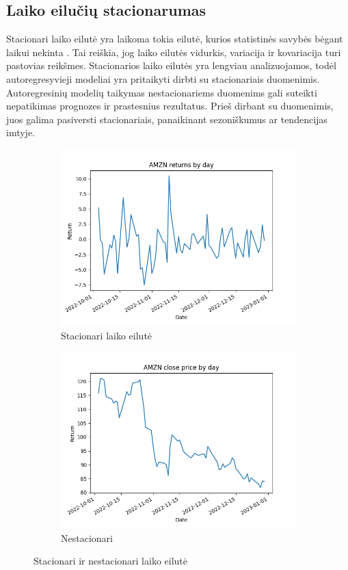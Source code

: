 \documentclass{VUMIFInfKursinis}
\begin{document}
\subsection {Laiko eilučių stacionarumas}
Stacionari laiko eilutė yra laikoma tokia eilutė, kurios statistinės savybės bėgant laikui nekinta \cite{nason2006stationary}. Tai reiškia, jog laiko eilutės vidurkis,
variacija ir kovariacija turi pastovias reikšmes. Stacionarios laiko eilutės yra lengviau analizuojamos, todėl autoregresyvieji modeliai yra pritaikyti dirbti su 
stacionariais duomenimis. Autoregresinių modelių taikymas nestacionariems duomenims gali suteikti nepatikimas prognozes ir prastesnius rezultatus. 
Prieš dirbant su duomenimis, juos galima pasiversti stacionariais, panaikinant sezoniškumus ar tendencijas imtyje.

\begin{figure}[H]
  \centering
  \begin{subfigure}{.5\textwidth}
    \centering
    \includegraphics[width=.6\linewidth]{img/AMZN_daily_return.png}
    \caption{Stacionari laiko eilutė}
    \label{fig:sub1}
  \end{subfigure}%
  \begin{subfigure}{.5\textwidth}
    \centering
    \includegraphics[width=.6\linewidth]{img/AMZN_daily_close.png}
    \caption{Nestacionari}
    \label{fig:sub2}
  \end{subfigure}
  \caption{Stacionari ir nestacionari laiko eilutė}
  \label{fig:test}
\end{figure}
\end{document}
